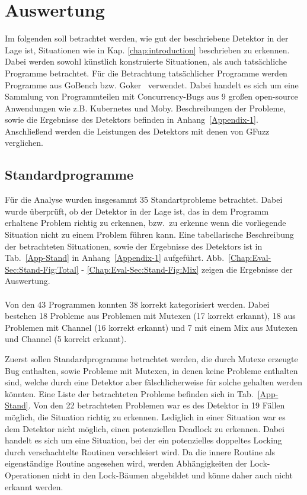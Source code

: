 \chapter{Auswertung}\label{Chap:Eval}
Im folgenden soll betrachtet werden, wie gut der beschriebene Detektor 
in der Lage ist, Situationen wie in Kap. \ref{chap:introduction} 
beschrieben zu erkennen. Dabei werden sowohl künstlich konstruierte 
Situationen, als auch tatsächliche Programme betrachtet. Für die Betrachtung 
tatsächlicher Programme werden Programme aus GoBench bzw. Goker~\cite{gobench}
verwendet. Dabei handelt es sich um eine Sammlung von Programmteilen mit 
Concurrency-Bugs aus 9 
großen open-source Anwendungen wie z.B. Kubernetes und Moby. 
Beschreibungen der Probleme, sowie die Ergebnisse des Detektors befinden in 
Anhang~\ref{Appendix-1}.\\
Anschließend werden die Leistungen des Detektors mit denen von GFuzz verglichen.

\section{Standardprogramme}
Für die Analyse wurden insgesammt 35 Standartprobleme betrachtet. 
Dabei wurde überprüft, ob der Detektor in der Lage ist, das in dem 
Programm erhaltene Problem richtig zu erkennen, bzw.~zu erkenne wenn 
die vorliegende Situation nicht zu einem Problem führen kann. Eine 
tabellarische Beschreibung der betrachteten Situationen, sowie der Ergebnisse 
des Detektors ist in Tab.~\ref{App-Stand} in Anhang~\ref{Appendix-1} aufgeführt.
Abb.~\ref{Chap:Eval-Sec:Stand-Fig:Total} - \ref{Chap:Eval-Sec:Stand-Fig:Mix}
zeigen die Ergebnisse der Auswertung.\\\\
Von den 43 Programmen konnten 38 korrekt kategorisiert werden. Dabei 
bestehen 18 Probleme aus Problemen mit Mutexen (17 korrekt erkannt),
18 aus Problemen mit Channel (16 korrekt erkannt) und 7 mit einem 
Mix aus Mutexen und Channel (5 korrekt erkannt).



Zuerst sollen Standardprogramme betrachtet werden, die durch Mutexe erzeugte 
Bug enthalten, sowie Probleme mit Mutexen, in denen keine Probleme enthalten 
sind, welche durch eine Detektor aber fälschlicherweise für solche gehalten werden 
könnten. Eine Liste der betrachteten Probleme befinden sich in 
Tab.~\ref{App-Stand}. Von den 22 betrachteten Problemen war es des 
Detektor in 19 Fällen möglich, die Situation richtig zu erkennen. Lediglich 
in einer Situation war es dem Detektor nicht möglich, einen potenziellen 
Deadlock zu erkennen. Dabei handelt es sich um eine Situation, bei der 
ein potenzielles doppeltes Locking durch verschachtelte Routinen verschleiert 
wird. Da die innere Routine als eigenständige Routine angesehen wird, 
werden Abhängigkeiten der Lock-Operationen nicht in den Lock-Bäumen abgebildet 
und könne daher auch nicht erkannt werden. \\



